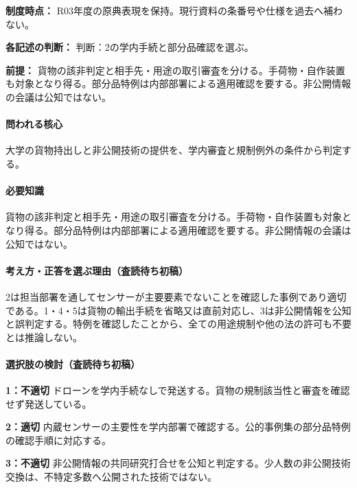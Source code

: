 \noindent\textbf{制度時点：} R03年度の原典表現を保持。現行資料の条番号や仕様を過去へ補わない。\par

\noindent\textbf{各記述の判断：} 判断：2の学内手続と部分品確認を選ぶ。\par

\noindent\textbf{前提：} 貨物の該非判定と相手先・用途の取引審査を分ける。手荷物・自作装置も対象となり得る。部分品特例は内部部署による適用確認を要する。非公開情報の会議は公知ではない。\par

\paragraph{問われる核心} 大学の貨物持出しと非公開技術の提供を、学内審査と規制例外の条件から判定する。

\paragraph{必要知識} 貨物の該非判定と相手先・用途の取引審査を分ける。手荷物・自作装置も対象となり得る。部分品特例は内部部署による適用確認を要する。非公開情報の会議は公知ではない。

\paragraph{考え方・正答を選ぶ理由（査読待ち初稿）} 2は担当部署を通してセンサーが主要要素でないことを確認した事例であり適切である。1・4・5は貨物の輸出手続を省略又は直前対応し、3は非公開情報を公知と誤判定する。特例を確認したことから、全ての用途規制や他の法の許可も不要とは推論しない。

\paragraph{選択肢の検討（査読待ち初稿）}\mbox{}\par

\noindent\textbf{1：不適切} ドローンを学内手続なしで発送する。貨物の規制該当性と審査を確認せず発送している。\par

\noindent\textbf{2：適切} 内蔵センサーの主要性を学内部署で確認する。公的事例集の部分品特例の確認手順に対応する。\par

\noindent\textbf{3：不適切} 非公開情報の共同研究打合せを公知と判定する。少人数の非公開技術交換は、不特定多数へ公開された技術ではない。\par

